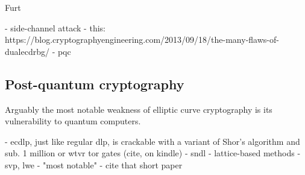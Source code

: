 \documentclass[a4paper]{article}
\begin{document}
Furt

- side-channel attack
- this: https://blog.cryptographyengineering.com/2013/09/18/the-many-flaws-of-dualecdrbg/ \cite{blog}
- pqc

\subsection{Post-quantum cryptography}

Arguably the most notable weakness of elliptic curve cryptography is its vulnerability to quantum computers.

- ecdlp, just like regular dlp, is crackable with a variant of Shor's algorithm and sub. 1 million or wtvr tor gates (cite, on kindle)
- sndl
- lattice-based methods
- svp, lwe
- "most notable" - cite that short paper


\newpage


\end{document}
